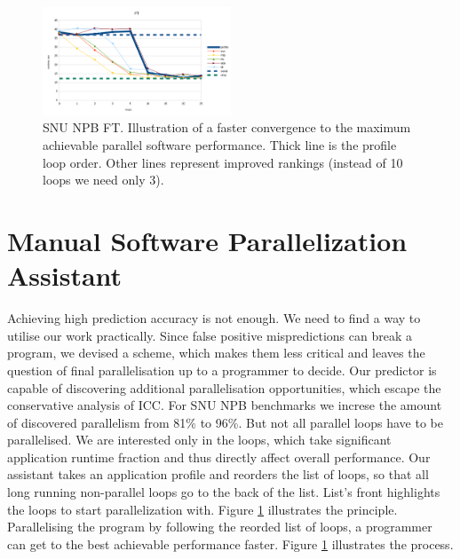\documentclass{acaces}
\begin{document}
\begin{figure}
	\includegraphics[width=0.5\textwidth]{ft_parallelisation}
	\caption{SNU NPB FT. Illustration of a faster convergence to the maximum achievable parallel software performance. Thick line is the profile loop order. Other lines represent improved rankings (instead of 10 loops we need only 3).}
	\label{convergence}
\end{figure}\null
\section{Manual Software Parallelization Assistant}
\label{predicting_parallel_loops}
\quad Achieving high prediction accuracy is not enough. We need to find a way to utilise our work practically. Since false positive mispredictions can break a program, we devised a scheme, which makes them less critical and leaves the question of final parallelisation up to a programmer to decide.\newline\null
\quad Our predictor is capable of discovering additional parallelisation opportunities, which escape the conservative analysis of ICC. For SNU NPB benchmarks we increse the amount of discovered parallelism from 81\% to 96\%. But not all parallel loops have to be parallelised. We are interested only in the loops, which take significant application runtime fraction and thus directly affect overall performance. Our assistant takes an application profile and reorders the list of loops, so that all long running non-parallel loops go to the back of the list. List's front highlights the loops to start parallelization with. Figure \ref{convergence} illustrates the principle. Parallelising the program by following the reorded list of loops, a programmer can get to the best achievable performance faster. Figure \ref{convergence} illustrates the process.   


\end{document}
